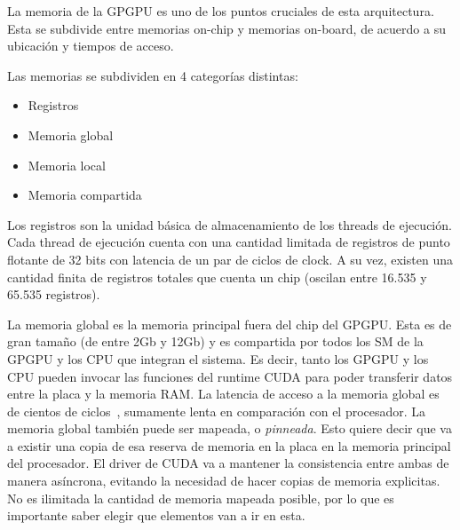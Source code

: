 %
%
La memoria de la GPGPU es uno de los puntos cruciales de esta arquitectura. Esta se subdivide
entre memorias on-chip y memorias on-board, de acuerdo a su ubicaci\'on y tiempos de acceso.

Las memorias se subdividen en 4 categor\'ias distintas:

\begin{itemize}
  \item Registros
  \item Memoria global
  \item Memoria local
  \item Memoria compartida
\end{itemize}

Los registros son la unidad b\'asica de almacenamiento de los threads de ejecuci\'on.
Cada thread de ejecuci\'on cuenta con una cantidad limitada de registros de punto flotante de
32 bits con latencia de un par de ciclos de clock. A su vez, existen una cantidad finita de
registros totales que cuenta un chip (oscilan entre 16.535 y 65.535 registros).

La memoria global es la memoria principal fuera del chip del GPGPU. Esta es de gran tama\~no (de
entre 2Gb y 12Gb) y es compartida por todos los SM de la GPGPU y los CPU que integran el
sistema. Es decir, tanto los GPGPU y los CPU pueden invocar las funciones del runtime CUDA
para poder transferir datos entre la placa y la memoria RAM. La latencia de acceso a la memoria global
es de cientos de ciclos~\cite{Demystifying}, sumamente lenta en comparaci\'on con el procesador.
La memoria global tambi\'en puede ser mapeada, o \textit{pinneada}. Esto quiere decir que va a existir
una copia de esa reserva de memoria en la placa en la memoria principal del procesador. El driver
de CUDA va a mantener la consistencia entre ambas de manera as\'incrona, evitando la necesidad de hacer
copias de memoria explicitas. No es ilimitada la cantidad de memoria mapeada posible, por lo que
es importante saber elegir que elementos van a ir en esta.

